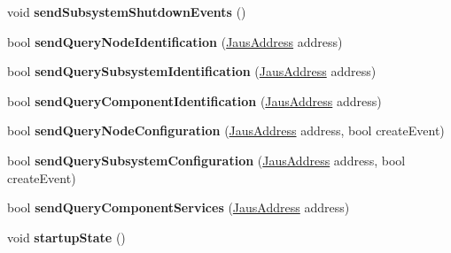 \begin{DoxyCompactItemize}
\item 
\hypertarget{class_node_manager_component_a967d93d4a3922c78710eedc8c46cfaa6}{void {\bfseries send\-Subsystem\-Shutdown\-Events} ()}\label{class_node_manager_component_a967d93d4a3922c78710eedc8c46cfaa6}

\item 
\hypertarget{class_node_manager_component_a2aa1b898331382708e5a70f2e0d4aafa}{bool {\bfseries send\-Query\-Node\-Identification} (\hyperlink{struct_jaus_address_struct}{\-Jaus\-Address} address)}\label{class_node_manager_component_a2aa1b898331382708e5a70f2e0d4aafa}

\item 
\hypertarget{class_node_manager_component_af6ff6075859bdc47ab5f6faf68d3fdb7}{bool {\bfseries send\-Query\-Subsystem\-Identification} (\hyperlink{struct_jaus_address_struct}{\-Jaus\-Address} address)}\label{class_node_manager_component_af6ff6075859bdc47ab5f6faf68d3fdb7}

\item 
\hypertarget{class_node_manager_component_a5117e381dd6d9c98e551a5bf318adcd5}{bool {\bfseries send\-Query\-Component\-Identification} (\hyperlink{struct_jaus_address_struct}{\-Jaus\-Address} address)}\label{class_node_manager_component_a5117e381dd6d9c98e551a5bf318adcd5}

\item 
\hypertarget{class_node_manager_component_a8e9e183789cd2496c7cad0fc10d3b8a9}{bool {\bfseries send\-Query\-Node\-Configuration} (\hyperlink{struct_jaus_address_struct}{\-Jaus\-Address} address, bool create\-Event)}\label{class_node_manager_component_a8e9e183789cd2496c7cad0fc10d3b8a9}

\item 
\hypertarget{class_node_manager_component_aef0f2a3efbc4362bc166737a20eb90ea}{bool {\bfseries send\-Query\-Subsystem\-Configuration} (\hyperlink{struct_jaus_address_struct}{\-Jaus\-Address} address, bool create\-Event)}\label{class_node_manager_component_aef0f2a3efbc4362bc166737a20eb90ea}

\item 
\hypertarget{class_node_manager_component_a3944581cfb6da2af8a921e7ee195c0bf}{bool {\bfseries send\-Query\-Component\-Services} (\hyperlink{struct_jaus_address_struct}{\-Jaus\-Address} address)}\label{class_node_manager_component_a3944581cfb6da2af8a921e7ee195c0bf}

\item 
\hypertarget{class_node_manager_component_a46a4078e6dcc77b683ed645a05bd08b5}{void {\bfseries startup\-State} ()}\label{class_node_manager_component_a46a4078e6dcc77b683ed645a05bd08b5}


\end{DoxyCompactItemize}
